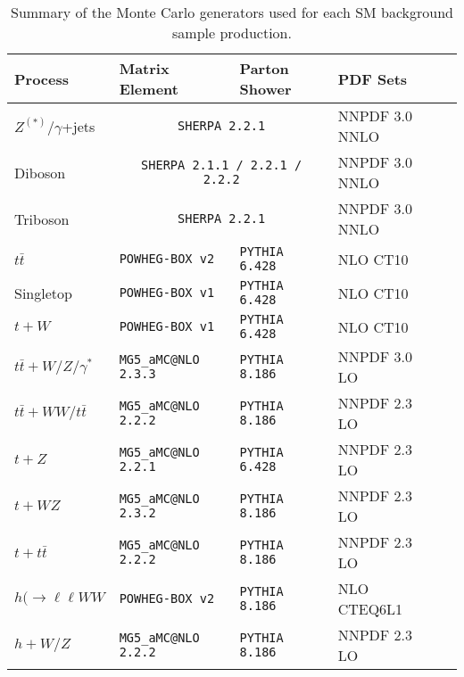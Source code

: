  \begin{table}[tbp]
\centering
\begin{tabular}{lllll}
\hline
Process       & Matrix Element & Parton Shower & PDF Sets\\
\hline
\hline
$Z^{(*)}/\gamma$+jets &\multicolumn{2}{c}{ \texttt{SHERPA 2.2.1}}   & NNPDF 3.0 NNLO\\

Diboson &\multicolumn{2}{c}{ \texttt{SHERPA 2.1.1 / 2.2.1 / 2.2.2}} & NNPDF 3.0 NNLO\\
Triboson &\multicolumn{2}{c}{ \texttt{SHERPA 2.2.1}}& NNPDF 3.0 NNLO\\
\hline
$t\bar{t}$ & \texttt{POWHEG-BOX v2} &\texttt{PYTHIA 6.428} & NLO CT10\\
Singletop &\texttt{POWHEG-BOX v1}& \texttt{PYTHIA 6.428} & NLO CT10\\
$t+W$ &\texttt{POWHEG-BOX v1}& \texttt{PYTHIA 6.428} & NLO CT10\\
\hline
$t\bar{t}+W/Z/\gamma^*$ & \texttt{MG5\_aMC@NLO 2.3.3}& \texttt{PYTHIA 8.186} & NNPDF 3.0 LO\\
$t\bar{t}+WW/t\bar{t}$ & \texttt{MG5\_aMC@NLO 2.2.2} &\texttt{PYTHIA 8.186} & NNPDF 2.3 LO\\
 $t+Z$&\texttt{MG5\_aMC@NLO 2.2.1}& \texttt{PYTHIA 6.428} & NNPDF 2.3 LO\\
  $t+WZ$&\texttt{MG5\_aMC@NLO 2.3.2}& \texttt{PYTHIA 8.186} & NNPDF 2.3 LO\\
$t+t\bar{t}$ & \texttt{MG5\_aMC@NLO 2.2.2} &\texttt{PYTHIA 8.186} & NNPDF 2.3 LO\\
\hline
$h(\rightarrow\ell\ell WW$ &\texttt{POWHEG-BOX v2}&  \texttt{PYTHIA 8.186} & NLO CTEQ6L1\\
 $h+W/Z$& \texttt{MG5\_aMC@NLO 2.2.2}&\texttt{PYTHIA 8.186} & NNPDF 2.3 LO\\
\hline
\hline
\end{tabular}

\caption{Summary of the Monte Carlo generators used for each SM background sample production.}
\label{tab:summarySMMC}
\end{table}

 \iffalse

 \begin{itemize}
 \item Detector simulation done with GEANT4.  GEANT4 models the ATLAS detector geometry, material interactions, and magnetic field potentials. 
 \item Pileup is modeled \textcolor{red}{how is it modeled}  
 \item \textcolor{blue}{Monte Carlo processed by sub-detector specific digitization algorithms, which translate the particle signatures in the detector into raw byte-stream data of the form that comes from the ATLAS detector.  Finally, fully simulated RDOs are reconstructed with release ?? of the ATLAS	 Athena reconstruction software, just like when processing real data.}
 \item \textcolor{red}{Do I want to make a schematic that illustrates the process of producing ATLAS MC simulation?}
 \end{itemize}
 \fi
 
